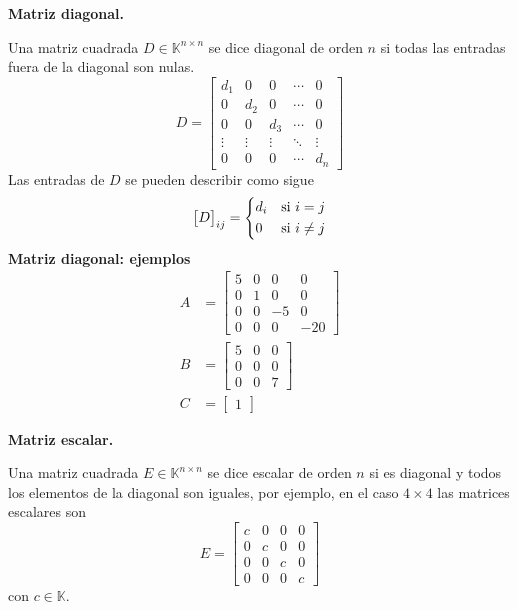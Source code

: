 \documentclass{article}
\theoremstyle{definition}
\theoremstyle{definition}
\theoremstyle{remark}
\begin{document}
\begin{center}
\textbf{Matriz diagonal.}
\end{center}
Una matriz cuadrada $D \in \mathbb{K}^{n \times n}$ se dice diagonal de orden $n$ si todas las entradas fuera de la diagonal son nulas. \[
  D=\begin{bmatrix} d_1 & 0 & 0 & \cdots & 0 \\
    0 & d_2 & 0 & \cdots & 0 \\
    0 & 0 & d_3 & \cdots & 0 \\
    \vdots & \vdots & \vdots & \ddots & \vdots \\
    0 & 0 & 0 & \cdots & d_n
  \end{bmatrix}
\]
Las entradas de $D$ se pueden describir como sigue \[
  \begin{bmatrix}D\end{bmatrix}_{ij} = \begin{dcases}
  d_i & \text{si }  i = j  \\
0 & \text{si } i \neq j \end{dcases}
\]
\textbf{Matriz diagonal: ejemplos} \[\begin{aligned}
  A&=\begin{bmatrix}5 & 0 & 0 & 0 \\
    0 & 1 & 0 & 0 \\
    0 & 0 & -5 & 0 \\
  0 & 0 & 0 & -20 \end{bmatrix} \\
    B&=\begin{bmatrix}5 & 0 & 0 \\ 0 & 0 & 0 \\ 0 & 0 & 7 \end{bmatrix} \\
    C&=\begin{bmatrix}1\end{bmatrix}
  \end{aligned}
\]
\begin{center}
\textbf{Matriz escalar.}
\end{center}
Una matriz cuadrada $E \in \mathbb{K}^{n \times n}$ se dice escalar de orden $n$ si es diagonal y todos los elementos de la diagonal son iguales, por ejemplo, en el caso $4 \times 4$ las matrices escalares son \[
  E=\begin{bmatrix} c & 0 & 0 & 0 \\ 0 & c & 0 & 0 \\ 0 & 0 & c & 0 \\ 0 & 0 & 0 & c \end{bmatrix} 
\]con $ c \in \mathbb{K}$.\\\\
\end{document}
